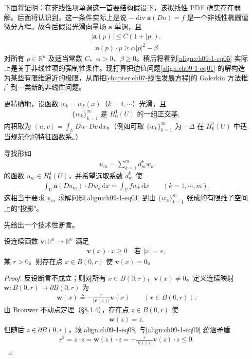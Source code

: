 \documentclass[../../main.tex]{subfiles}
\begin{document}
下面将证明：在非线性项单调这一首要结构假设下，该拟线性 PDE 确实存在弱解。后面将认识到，这一条件实际上是说 $-\operatorname{div}\mathbf{a}(Du)=f$ 是一个非线性椭圆偏微分方程。故今后假设光滑向量场 $\mathbf{a}$ 单调，且
\begin{align}
|\mathbf{a}(p)|\leqslant C(1+|p|),\label{align:ch09-1-eq04}
\end{align}
\begin{align}
\mathbf{a}(p)\cdot p\geqslant\alpha|p|^2-\beta\label{align:ch09-1-eq05}
\end{align}
对所有 $p\in\mathbb{R}^n$ 及适当常数 $C$、$\alpha>0$、$\beta\geqslant 0$。稍后将看到\eqref{align:ch09-1-eq05} 实际上是关于非线性项的强制性条件。现打算把边值问题\eqref{align:ch09-1-eq01} 的解构造为某些有限维逼近的极限，从而把\cref{chapter:ch07-线性发展方程}的 Galerkin 方法推广到一类新的非线性问题。

更精确地，设函数 $w_k=w_k(x)$（$k=1,\cdots$）光滑，且
\begin{align*}
\{w_k\}_{k=1}^\infty\text{ 是 }H_0^1(U)\text{ 的一组正交基},
\end{align*}
内积取为 $(u,v)=\int_U Du\cdot Dv\,\mathrm{d}x$。（例如可取 $\{w_k\}_{k=1}^\infty$ 为 $-\Delta$ 在 $H_0^1(U)$ 中适当规范化的特征函数系。）

寻找形如
\begin{align}
u_m=\sum_{k=1}^m d_m^k w_k\label{align:ch09-1-eq06}
\end{align}
的函数 $u_m\in H_0^1(U)$，并希望选取系数 $d_m^k$ 使
\begin{align}
\int_U\mathbf{a}(Du_m)\cdot Dw_k\,\mathrm{d}x=\int_U fw_k\,\mathrm{d}x\qquad (k=1,\cdots,m).\label{align:ch09-1-eq07}
\end{align}
这相当于要求 $u_m$ 求解问题\eqref{align:ch09-1-eq01} 到由 $\{w_k\}_{k=1}^m$ 张成的有限维子空间上的"投影"。

先给出一个技术性断言。

\begin{lemma}[向量场的零点]\label{lemma:ch09-1-向量场零点}
设连续函数 $\mathbf{v}:\mathbb{R}^n\to\mathbb{R}^n$ 满足
\begin{align}
\mathbf{v}(x)\cdot x\geqslant 0\quad\text{若 }|x|=r,\label{align:ch09-1-eq08}
\end{align}
某 $r>0$。则存在点 $x\in B(0,r)$ 使 $\mathbf{v}(x)=0$。
\begin{proof}
反设断言不成立；则对所有 $x\in B(0,r)$，$\mathbf{v}(x)\neq 0$。定义连续映射 $\mathbf{w}:B(0,r)\to\partial B(0,r)$ 为
\begin{align*}
\mathbf{w}(x)\triangleq-\frac{r}{|\mathbf{v}(x)|}\mathbf{v}(x)\qquad (x\in B(0,r)).
\end{align*}
由 Brouwer 不动点定理（\S8.1.4），存在点 $z\in B(0,r)$ 使
\begin{align}
\mathbf{w}(z)=z.\label{align:ch09-1-eq09}
\end{align}
但随后 $z\in\partial B(0,r)$，故\eqref{align:ch09-1-eq08} 与\eqref{align:ch09-1-eq09} 蕴涵矛盾
\begin{align*}
r^2=z\cdot z=\mathbf{w}(z)\cdot z=-\frac{r}{|\mathbf{v}(z)|}\mathbf{v}(z)\cdot z\leqslant 0.
\end{align*}
\end{proof}
\end{lemma}
\end{document}
